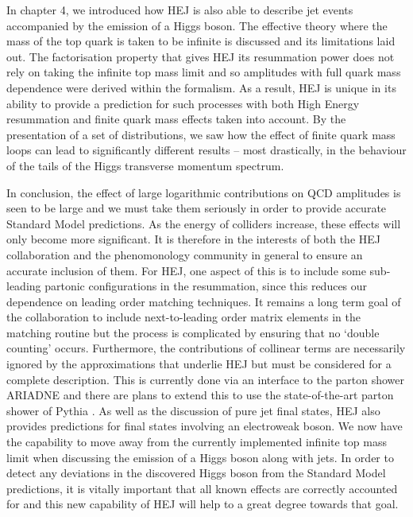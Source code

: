 In chapter 4, we introduced how HEJ is also able to describe jet events accompanied by the emission of a Higgs boson. The effective theory where the mass of the top quark is taken to be infinite is discussed and its limitations laid out. The factorisation property that gives HEJ its resummation power does not rely on taking the infinite top mass limit and so amplitudes with full quark mass dependence were derived within the formalism. As a result, HEJ is unique in its ability to provide a prediction for such processes with both High Energy resummation and finite quark mass effects taken into account. By the presentation of a set of distributions, we saw how the effect of finite quark mass loops can lead to significantly different results -- most drastically, in the behaviour of the tails of the Higgs transverse momentum spectrum. 

In conclusion, the effect of large logarithmic contributions on QCD amplitudes is seen to be large and we must take them seriously in order to provide accurate Standard Model predictions. As the energy of colliders increase, these effects will only become more significant. It is therefore in the interests of both the HEJ collaboration and the phenomonology community in general to ensure an accurate inclusion of them. For HEJ, one aspect of this is to include some sub-leading partonic configurations in the resummation, since this reduces our dependence on leading order matching techniques. It remains a long term goal of the collaboration to include next-to-leading order matrix elements in the matching routine but the process is complicated by ensuring that no `double counting' occurs. Furthermore, the contributions of collinear terms are necessarily ignored by the approximations that underlie HEJ but must be considered for a complete description. This is currently done via an interface to the parton shower ARIADNE and there are plans to extend this to use the state-of-the-art parton shower of Pythia \cite{Sjostrand2007}. As well as the discussion of pure jet final states, HEJ also provides predictions for final states involving an electroweak boson. We now have the capability to move away from the currently implemented infinite top mass limit when discussing the emission of a Higgs boson along with jets. In order to detect any deviations in the discovered Higgs boson from the Standard Model predictions, it is vitally important that all known effects are correctly accounted for and this new capability of HEJ will help to a great degree towards that goal.